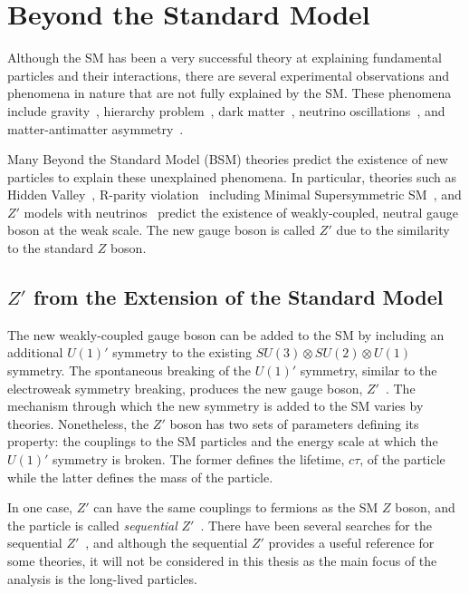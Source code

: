 \section{Beyond the Standard Model}
\label{sec:intro:bsm}

Although the SM has been a very successful theory at explaining fundamental particles and their interactions, there are several experimental observations and phenomena in nature that are not fully explained by the SM. These phenomena include gravity~\cite{PhysRevD.69.105009}, hierarchy problem~\cite{Magg:875284,Magg:133759}, dark matter~\cite{Alpigiani:2281629,bertone2005particle,clowe2006direct}, neutrino oscillations~\cite{ahn2003indications}, and matter-antimatter asymmetry~\cite{toussaint1979matter,dine2003origin}. 

Many Beyond the Standard Model (BSM) theories predict the existence of new particles to explain these unexplained phenomena. In particular, theories such as Hidden Valley~\cite{strassler2007echoes,cassel2010electroweak}, R-parity violation~\cite{senjanovic1975exact,mohapatra1981neutrino} including Minimal Supersymmetric SM~\cite{Barbier:2004ez}, and $Z'$ models with neutrinos~\cite{Basso:2008iv} predict the existence of weakly-coupled, neutral gauge boson at the weak scale. The new gauge boson is called $Z'$ due to the similarity to the standard $Z$ boson. 

\subsection{\texorpdfstring{$Z'$}{Z'} from the Extension of the Standard Model}
\label{sec:intro:zprime_extension}

The new weakly-coupled gauge boson can be added to the SM by including an additional $U(1)'$ symmetry to the existing $SU(3) \otimes SU(2) \otimes U(1)$ symmetry. The spontaneous breaking of the $U(1)'$ symmetry, similar to the electroweak symmetry breaking, produces the new gauge boson, $Z'$~\cite{Langacker:2008yv}. The mechanism through which the new symmetry is added to the SM varies by theories. Nonetheless, the $Z'$ boson has two sets of parameters defining its property: the couplings to the SM particles and the energy scale at which the $U(1)'$ symmetry is broken. The former defines the lifetime, $c\tau$, of the particle while the latter defines the mass of the particle.

In one case, $Z'$ can have the same couplings to fermions as the SM $Z$ boson, and the particle is called \textit{sequential} $Z'$~\cite{BARGER1980377}. There have been several searches for the sequential $Z'$~\cite{PhysRevD.86.095010,ABAZOV201188,PhysRevD.90.052005}, and although the sequential $Z'$ provides a useful reference for some theories, it will not be considered in this thesis as the main focus of the analysis is the long-lived particles.

